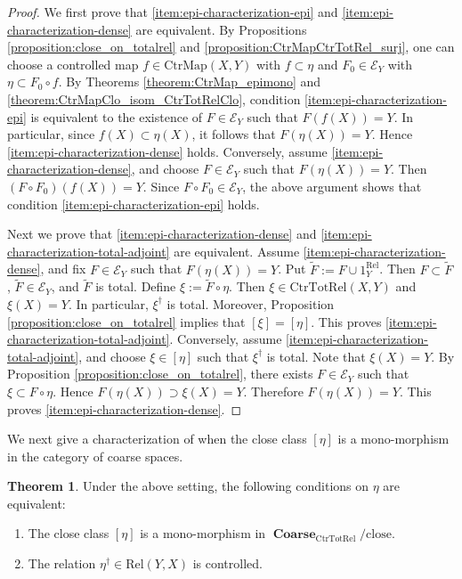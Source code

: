 \documentclass[12pt, a4paper]{amsart}
\theoremstyle{definition}
\newtheorem{theorem}{Theorem}[section]
\newcommand{\Coarse}{\mathop{\mathbf{Coarse}}\nolimits}
\newcommand{\Rel}{\mathrm{Rel}}
\newcommand{\CtrMap}{\mathrm{CtrMap}}
\newcommand{\CtrTotRel}{\mathrm{CtrTotRel}}
\newcommand{\close}{\mathrm{close}}
\begin{document}
\begin{proof}
We first prove that
\eqref{item:epi-characterization-epi}
and
\eqref{item:epi-characterization-dense}
are equivalent. 
By Propositions \ref{proposition:close_on_totalrel} and
\ref{proposition:CtrMapCtrTotRel_surj},
one can choose a controlled map
$f \in \CtrMap(X,Y)$
with $f \subset \eta$ and
$F_0 \in \mathcal{E}_Y$
with $\eta \subset F_0 \circ f$.
By Theorems \ref{theorem:CtrMap_epimono} and \ref{theorem:CtrMapClo_isom_CtrTotRelClo},
condition
\eqref{item:epi-characterization-epi}
is equivalent to the existence of
$F \in \mathcal{E}_Y$
such that
$F(f(X))=Y$.
In particular, since
$f(X)\subset \eta(X)$,
it follows that
$F(\eta(X))=Y$.
Hence
\eqref{item:epi-characterization-dense}
holds.
Conversely, assume
\eqref{item:epi-characterization-dense},
and choose
$F \in \mathcal{E}_Y$
such that
$F(\eta(X))=Y$.
Then
$(F\circ F_0)(f(X))=Y$.
Since
$F\circ F_0\in\mathcal{E}_Y$,
the above argument shows that
condition
\eqref{item:epi-characterization-epi}
holds.

Next we prove that
\eqref{item:epi-characterization-dense}
and
\eqref{item:epi-characterization-total-adjoint}
are equivalent.
Assume
\eqref{item:epi-characterization-dense},
and fix
$F\in\mathcal{E}_Y$
such that
$F(\eta(X))=Y$.
Put
$\widetilde{F}:=F\cup 1_Y^{\Rel}$.
Then
$F\subset\widetilde{F}$,
$\widetilde{F}\in\mathcal{E}_Y$,
and
$\widetilde{F}$ is total.
Define
$\xi:=\widetilde{F}\circ\eta$.
Then
$\xi\in\CtrTotRel(X,Y)$
and
$\xi(X)=Y$.
In particular,
$\xi^\dagger$
is total.
Moreover,
Proposition \ref{proposition:close_on_totalrel}
implies that
$[\xi]=[\eta]$.
This proves
\eqref{item:epi-characterization-total-adjoint}.
Conversely, assume
\eqref{item:epi-characterization-total-adjoint},
and choose
$\xi\in[\eta]$
such that
$\xi^\dagger$
is total.
Note that
$\xi(X)=Y$.
By Proposition \ref{proposition:close_on_totalrel},
there exists
$F\in\mathcal{E}_Y$
such that 
$\xi\subset F\circ\eta$.
Hence
$F(\eta(X))\supset \xi(X)=Y$.
Therefore
$F(\eta(X))=Y$.
This proves
\eqref{item:epi-characterization-dense}.
\end{proof}


We next give a characterization of when the close class $[\eta]$ is a mono-morphism in the category of coarse spaces.

\begin{theorem}\label{thm:mono-characterization}
Under the above setting, the following conditions on $\eta$ are equivalent:
\begin{enumerate}
    \item\label{item:mono-characterization-mono}
    The close class $[\eta]$ is a mono-morphism in
    $\Coarse_{\CtrTotRel}/\close$.
    \item \label{item:mono-characterization-controlled-adjoint}
    The relation $\eta^\dagger \in \Rel(Y,X)$ is controlled.
\end{enumerate}
\end{theorem}
\end{document}
